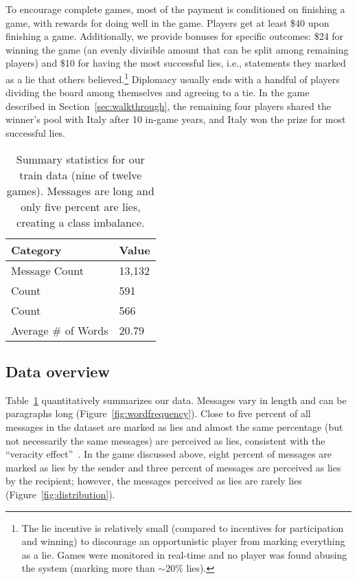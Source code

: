 To encourage complete games, most of the payment is conditioned on
finishing a game, with rewards for doing well in the game.
%
Players get at least \$40 upon
finishing a game.
%
Additionally, we provide bonuses for specific outcomes: \$24 for
winning the game (an evenly divisible amount that can be split among
remaining players) and \$10 for having the most successful lies, i.e.,
statements they marked as a lie that others believed.\footnote{The lie
  incentive is relatively small (compared to incentives for
  participation and winning) to discourage an opportunistic player
  from marking everything as a lie. Games were monitored in real-time
  and no player was found abusing the system (marking more than
  $\sim$20\% lies). }
%
Diplomacy usually ends with a handful of players dividing the board among
themselves and agreeing to a tie.
%
In the game described in Section~\ref{sec:walkthrough}, the remaining
four players shared the winner's pool with Italy after 10 in-game
years, and Italy won the prize for most successful lies.


\begin{table}[t]
	\centering
	\begin{tabular}{ l l }
		\textbf{Category}            & \textbf{Value}  \\ 
		\hline			
		Message Count       &  13,132 \\ 
		\alie{} Count      &  591 \\ 
		\slie{} Count  	  & 566 \\
		Average \# of Words & 20.79 \\
	\end{tabular}
	\caption{Summary statistics for our train data (nine of twelve games).  Messages are long and only five percent are lies, creating a class imbalance.}
	\label{tab:summarystats}
\end{table}

\subsection{Data overview}


%
Table~\ref{tab:summarystats} quantitatively summarizes our data.
%
Messages vary in length and can be paragraphs long
(Figure~\ref{fig:wordfrequency}).
%
Close to five percent of all messages in the dataset are marked as
lies and almost the same percentage (but not necessarily the same
messages) are perceived as lies, consistent with the ``veracity
effect''~\citep{levine-99}.
%
In the game discussed above, eight percent of messages are marked as
lies by the sender and three percent of messages are perceived as lies
by the recipient; however, the messages perceived as lies are rarely
lies (Figure~\ref{fig:distribution}).





